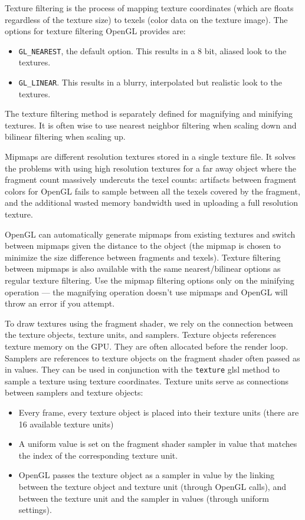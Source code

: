\documentclass[11pt]{article}
\numberwithin{equation}{section}
\begin{document}
Texture filtering is the process of mapping texture coordinates (which are floats regardless of the texture size) to texels (color data on the texture image). The options for texture filtering OpenGL provides are:
\begin{itemize}
	\item \verb|GL_NEAREST|, the default option. This results in a 8 bit, aliased look to the textures.
	\item \verb|GL_LINEAR|. This results in a blurry, interpolated but realistic look to the textures.
\end{itemize}
The texture filtering method is separately defined for magnifying and minifying textures. It is often wise to use nearest neighbor filtering when scaling down and bilinear filtering when scaling up.

Mipmaps are different resolution textures stored in a single texture file. It solves the problems with using high resolution textures for a far away object where the fragment count massively undercuts the texel counts: artifacts between fragment colors for OpenGL fails to sample between all the texels covered by the fragment, and the additional wasted memory bandwidth used in uploading a full resolution texture.

OpenGL can automatically generate mipmaps from existing textures and switch between mipmaps given the distance to the object (the mipmap is chosen to minimize the size difference between fragments and texels). Texture filtering between mipmaps is also available with the same nearest/bilinear options as regular texture filtering. Use the mipmap filtering options only on the minifying operation --- the magnifying operation doesn't use mipmaps and OpenGL will throw an error if you attempt.

To draw textures using the fragment shader, we rely on the connection between the texture objects, texture units, and samplers. Texture objects references texture memory on the GPU. They are often allocated before the render loop. Samplers are references to texture objects on the fragment shader often passed as in values. They can be used in conjunction with the \verb|texture| glsl method to sample a texture using texture coordinates. Texture units serve as connections between samplers and texture objects:
\begin{itemize}
	\item Every frame, every texture object is placed into their texture units (there are 16 available texture units)
	\item A uniform value is set on the fragment shader sampler in value that matches the index of the corresponding texture unit.
	\item OpenGL passes the texture object as a sampler in value by the linking between the texture object and texture unit (through OpenGL calls), and between the texture unit and the sampler in values (through uniform settings).
\end{itemize}
\end{document}
